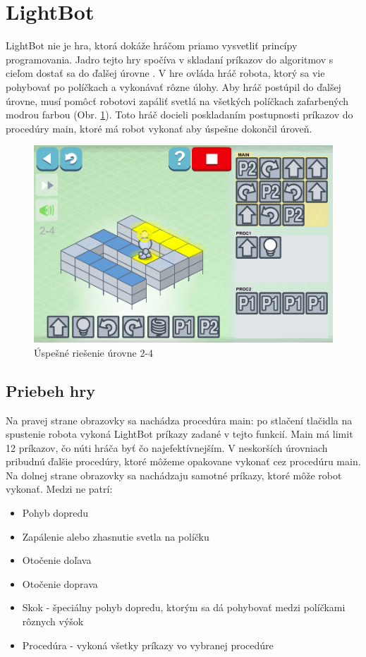 \documentclass[slovak,a4paper,10pt]{article}
\begin{document}
\section{LightBot}
LightBot nie je hra, ktorá dokáže hráčom priamo vysvetliť princípy programovania. Jadro tejto hry spočíva v skladaní príkazov do algoritmov s cieľom dostať sa do ďalšej úrovne \cite{combefis2016learning}. V hre ovláda hráč robota, ktorý sa vie pohybovať po políčkach a vykonávať rôzne úlohy. Aby hráč postúpil do ďalšej úrovne, musí pomôcť robotovi zapáliť svetlá na všetkých políčkach zafarbených modrou farbou (Obr. \ref{fig:obr3}). Toto hráč docieli poskladaním postupnosti príkazov do procedúry main, ktoré má robot vykonať aby úspešne dokončil úroveň.
\begin{figure}[h]
\includegraphics[scale=0.3]{lightbotmain}
\centering
\caption{Úspešné riešenie úrovne 2-4}
\label{fig:obr3}
\end{figure}
\subsection{Priebeh hry}
Na pravej strane obrazovky sa nachádza procedúra main: po stlačení tlačidla na spustenie robota vykoná LightBot príkazy zadané v tejto funkcií. Main má limit 12 príkazov, čo núti hráča byť čo najefektívnejším. V neskorších úrovniach pribudnú ďalšie procedúry, ktoré môžeme opakovane vykonať cez procedúru main. \\
Na dolnej strane obrazovky sa nachádzaju samotné príkazy, ktoré môže robot vykonať. Medzi ne patrí:
\begin{itemize}
\item Pohyb dopredu
\item Zapálenie alebo zhasnutie svetla na políčku
\item Otočenie doľava
\item Otočenie doprava
\item Skok - špeciálny pohyb dopredu, ktorým sa dá pohybovať medzi políčkami rôznych výšok
\item Procedúra - vykoná všetky príkazy vo vybranej procedúre
\end{itemize}
\end{document}
